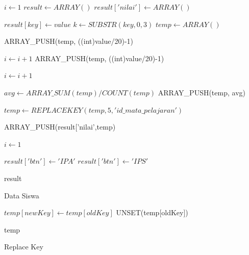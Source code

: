 \begin{algorithm}[H]
  \begin{algorithmic}[1]
        \State $i \gets 1$
        \State $result \gets ARRAY()$
        \State $result['nilai'] \gets ARRAY()$
        
                \State $result[key] \gets value$
            \Else
                    \State $k \gets SUBSTR(key, 0, 3)$
                    \State $temp \gets ARRAY()$
                    
                    \State ARRAY\_PUSH(temp, ((int)value/20)-1) 
                    
                    \State $i \gets i+1$
                \Else
                    \State ARRAY\_PUSH(temp, ((int)value/20)-1) 
                    
                    \State $i \gets i+1$
                    
                        \State $avg \gets ARRAY\_SUM(temp)/COUNT(temp)$
                        \State ARRAY\_PUSH(temp, avg)
                        
                        \State $temp \gets REPLACEKEY(temp, 5, 'id\_mata\_pelajaran')$
                        
                        \State ARRAY\_PUSH(result['nilai',temp)
                        
                        \State $i \gets 1$
                    \EndIf
                \EndIf
            \EndIf
        \EndFor
        
            \State $result['btn'] \gets 'IPA'$
            \State $result['btn'] \gets 'IPS'$
        \EndIf
        
        \State \Return result
    \EndProcedure
  \end{algorithmic} 
  \caption{Data Siswa}
  \label{alg:data siswa controller}
\end{algorithm}

\begin{algorithm}[H]
  \begin{algorithmic}[1]
        \State $temp[newKey] \gets temp[oldKey]$
        \State UNSET(temp[oldKey])
        
        \State \Return temp
    \EndProcedure
  \end{algorithmic} 
  \caption{Replace Key}
  \label{alg:Replace Key siswa controller}
\end{algorithm}

